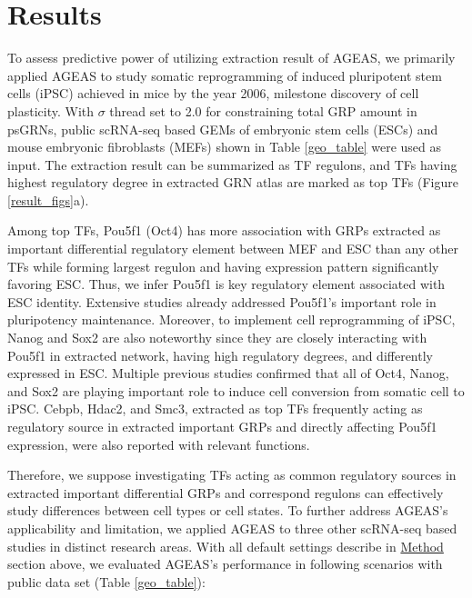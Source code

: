 \documentclass[fleqn,10pt]{wlscirep}
\begin{document}
\section*{Results}
  \label{res}
  To assess predictive power of utilizing extraction result of AGEAS, we primarily applied AGEAS to study somatic reprogramming of induced pluripotent stem cells (iPSC) achieved in mice by the year 2006, \cite{yamanaka_2006} milestone discovery of cell plasticity. \cite{cell_repro_review}
  With $\sigma$ thread set to 2.0 for constraining total GRP amount in psGRNs, public scRNA-seq based GEMs of embryonic stem cells (ESCs) and mouse embryonic fibroblasts (MEFs) shown in Table \ref{geo_table} were used as input.
  The extraction result can be summarized as TF regulons, and TFs having highest regulatory degree in extracted GRN atlas are marked as top TFs (Figure \ref{result_figs}a).

  Among top TFs, Pou5f1 (Oct4) has more association with GRPs extracted as important differential regulatory element between MEF and ESC than any other TFs while forming largest regulon and having expression pattern significantly favoring ESC.
  Thus, we infer Pou5f1 is key regulatory element associated with ESC identity.
  Extensive studies already addressed Pou5f1's important role in pluripotency maintenance. \cite{niwa_2007, oct4_1, oct4_2}
  Moreover, to implement cell reprogramming of iPSC, Nanog and Sox2 are also noteworthy since they are closely interacting with Pou5f1 in extracted network, having high regulatory degrees, and differently expressed in ESC.
  Multiple previous studies confirmed that all of Oct4, Nanog, and Sox2 are playing important role to induce cell conversion from somatic cell to iPSC. \cite{yamanaka_2006, ips7f, ipsOK, oct4_nanog_sox2_lin28, oct4_nanog_sox2}
  Cebpb, Hdac2, and Smc3, extracted as top TFs frequently acting as regulatory source in extracted important GRPs and directly affecting Pou5f1 expression, were also reported with relevant functions. \cite{cebpb_ipsc, hdac2_ipsc, rad21_smc3_esc}

  Therefore, we suppose investigating TFs acting as common regulatory sources in extracted important differential GRPs and correspond regulons can effectively study differences between cell types or cell states.
  To further address AGEAS's applicability and limitation, we applied AGEAS to three other scRNA-seq based studies in distinct research areas.
  With all default settings describe in \hyperref[method]{Method} section above, we evaluated AGEAS's performance in following scenarios with public data set (Table \ref{geo_table}):
\end{document}
